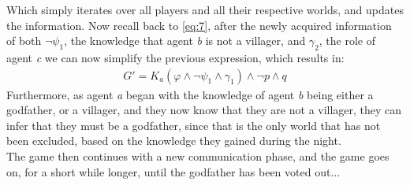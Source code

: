 Which simply iterates over all players and all their respective worlds, and
updates the information. Now recall back to \cref{eq:7}, after the newly
acquired information of both $\neg \psi_1$, the knowledge that agent \textit{b}
is not a villager, and $\gamma_2$, the role of agent \textit{c} we can now
simplify the previous expression, which results in:
\begin{align}
	G' = K_a(\varphi \land \neg \psi_1 \land \gamma_1) \land \neg p \land q
\end{align}
Furthermore, as agent \textit{a} began with the knowledge of agent \textit{b}
being either a godfather, or a villager, and they now know that they are not a
villager, they can infer that they must be a godfather, since that is the only
world that has not been excluded, based on the knowledge they gained during the
night. \\
The game then continues with a new communication phase, and the game goes on,
for a short while longer, until the godfather has been voted out...
